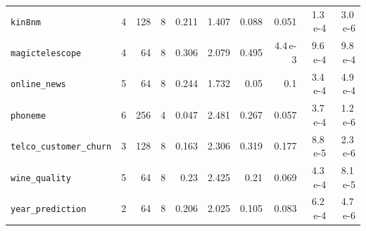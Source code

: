 \begin{table}[htbp]
\begin{tabular}{lrrrrrrrrr}
\texttt{kin8nm} & 4 & 128 & 8 & 0.211 & 1.407 & 0.088 & 0.051 & 1.3\,e-4 & 3.0\,e-6 \\
\texttt{magictelescope} & 4 & 64 & 8 & 0.306 & 2.079 & 0.495 & 4.4\,e-3 & 9.6\,e-4 & 9.8\,e-4 \\
\texttt{online\_news} & 5 & 64 & 8 & 0.244 & 1.732 & 0.05 & 0.1 & 3.4\,e-4 & 4.9\,e-4 \\
\texttt{phoneme} & 6 & 256 & 4 & 0.047 & 2.481 & 0.267 & 0.057 & 3.7\,e-4 & 1.2\,e-6 \\
\texttt{telco\_\allowbreak customer\_\allowbreak churn} & 3 & 128 & 8 & 0.163 & 2.306 & 0.319 & 0.177 & 8.8\,e-5 & 2.3\,e-6 \\
\texttt{wine\_quality} & 5 & 64 & 8 & 0.23 & 2.425 & 0.21 & 0.069 & 4.3\,e-4 & 8.1\,e-5 \\
\texttt{year\_\allowbreak prediction} & 2 & 64 & 8 & 0.206 & 2.025 & 0.105 & 0.083 & 6.2\,e-4 & 4.7\,e-6 \\
\bottomrule
\end{tabular}
\end{table}

